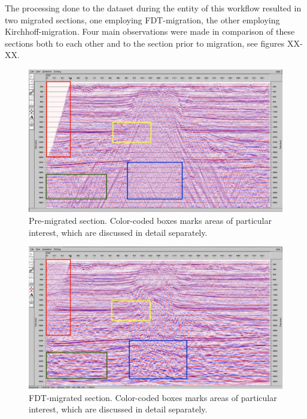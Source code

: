\documentclass[10pt,a4paper]{article}
\begin{document}
The processing done to the dataset during the entity of this workflow resulted in two migrated sections, one employing FDT-migration, the other employing Kirchhoff-migration. Four main observations were made in comparison of these sections both to each other and to the section prior to migration, see figures XX-XX. 

\begin{figure}[H]
\includegraphics[width=\textwidth]{ny1.jpg}
\caption{Pre-migrated section. Color-coded boxes marks areas of particular interest, which are discussed in detail separately.}
\label{ny1}
\end{figure}

\begin{figure}[H]
\includegraphics[width=\textwidth]{ny2.jpg}
\caption{FDT-migrated section. Color-coded boxes marks areas of particular interest, which are discussed in detail separately.}
\label{ny2}
\end{figure}
\end{document}
